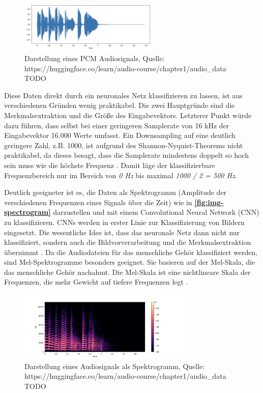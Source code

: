 \begin{figure}[h!]
\centering
\includegraphics[width=0.6\textwidth]{images/08_durchfuehrung/waveform_plot.png}
\caption{Darstellung eines PCM Audiosignals, Quelle:  https://huggingface.co/learn/audio-course/chapter1/audio\_data TODO }
\label{fig:img-pcm-graph}
\end{figure}

Diese Daten direkt durch ein neuronales Netz klassifizieren zu lassen, ist aus verschiedenen Gründen wenig praktikabel. Die zwei Hauptgründe sind die Merkmalsextraktion und die Größe des Eingabevektors. Letzterer Punkt würde dazu führen, dass selbst bei einer geringeren Samplerate von 16 kHz der Eingabevektor 16.000 Werte umfasst. Ein Downsampling auf eine deutlich geringere Zahl, z.B. 1000, ist aufgrund des Shannon-Nyquist-Theorems nicht praktikabel, da dieses besagt, dass die Samplerate mindestens doppelt so hoch sein muss wie die höchste Frequenz \cite{nyquist}. Damit läge der klassifizierbare Frequenzbereich nur im Bereich von \textit{0 Hz} bis maximal \textit{1000 / 2 = 500 Hz}.

Deutlich geeigneter ist es, die Daten als Spektrogramm (Amplitude der verschiedenen Frequenzen eines Signals über die Zeit) wie in \textbf{\autoref{fig:img-spectrogram}} darzustellen und mit einem Convolutional Neural Network (CNN) zu klassifizieren. CNNs werden in erster Linie zur Klassifizierung von Bildern eingesetzt. Die wesentliche Idee ist, dass das neuronale Netz dann nicht nur klassifiziert, sondern auch die Bildvorverarbeitung und die Merkmalsextraktion übernimmt \cite{how-cnn-work}. Da die Audiodateien für das menschliche Gehör klassifiziert werden, sind Mel-Spektrogramme besonders geeignet. Sie basieren auf der Mel-Skala, die das menschliche Gehör nachahmt. Die Mel-Skala ist eine nichtlineare Skala der Frequenzen, die mehr Gewicht auf tiefere Frequenzen legt \cite{mel-spectrogram}.

\begin{figure}[h!]
\centering
\includegraphics[width=0.75\textwidth]{images/08_durchfuehrung/spectrogram_plot.png}
\caption{Darstellung eines Audiosignals als Spektrogramm, Quelle:  https://huggingface.co/learn/audio-course/chapter1/audio\_data TODO }
\label{fig:img-spectrogram}
\end{figure}

